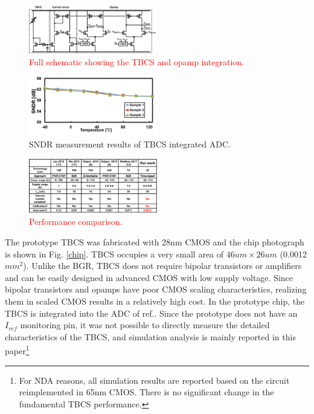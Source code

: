 \documentclass[paper]{ieice}
\begin{document}
\begin{figure}[!t]
\centering
 \includegraphics[width=0.5\textwidth]{figs/opamp.png}
  \caption{\textcolor{red}{Full schematic showing the TBCS and opamp integration.}}
\label{opamp}
\end{figure}

\begin{figure}[!t]
\centering
 \includegraphics[width=0.5\textwidth]{figs/sndr.png}
  \caption{SNDR measurement results of TBCS integrated ADC.}
\label{sndr}
\end{figure}

\begin{figure}[!t]
\centering
 \includegraphics[width=0.5\textwidth]{figs/comparison.png}
  \caption{\textcolor{red}{Performance comparison.}}
\label{sndr}
\end{figure}

\qquad The prototype TBCS was fabricated with 28nm CMOS and the chip photograph is shown in Fig. \ref{chip}. TBCS occupies a very small area of $46um \times 26um$ (0.0012$mm^2$). Unlike the BGR, TBCS does not require bipolar transistors or amplifiers and can be easily designed in advanced CMOS with low supply voltage. Since bipolar transistors and opamps have poor CMOS scaling characteristics, realizing them in scaled CMOS results in a relatively high cost. In the prototype chip, the TBCS is integrated into the ADC of ref.\cite{yoshioka201728}. Since the prototype does not have an $I_{ref}$ monitoring pin, it was not possible to directly measure the detailed characteristics of the TBCS, and simulation analysis is mainly reported in this paper\footnote{For NDA reasons, all simulation results are reported based on the circuit reimplemented in 65nm CMOS. There is no significant change in the fundamental TBCS performance.}
\end{document}
